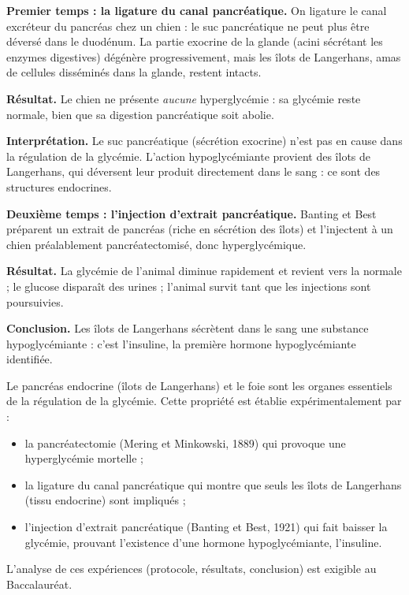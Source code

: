 \documentclass[11pt]{article}
\newcommand{\cle}[1]{{\popxbold\color{popdark}#1}}
\begin{document}
\begin{experience}
\textbf{Premier temps : la ligature du canal pancréatique.} On ligature le canal excréteur du pancréas chez un chien : le suc pancréatique ne peut plus être déversé dans le duodénum. La partie \cle{exocrine} de la glande (acini sécrétant les enzymes digestives) dégénère progressivement, mais les \cle{îlots de Langerhans}, amas de cellules disséminés dans la glande, restent intacts.

\textbf{Résultat.} Le chien ne présente \emph{aucune} hyperglycémie : sa glycémie reste normale, bien que sa digestion pancréatique soit abolie.

\textbf{Interprétation.} Le suc pancréatique (sécrétion exocrine) n'est pas en cause dans la régulation de la glycémie. L'action hypoglycémiante provient des îlots de Langerhans, qui déversent leur produit directement dans le sang : ce sont des structures \cle{endocrines}.

\textbf{Deuxième temps : l'injection d'extrait pancréatique.} Banting et Best préparent un extrait de pancréas (riche en sécrétion des îlots) et l'injectent à un chien préalablement pancréatectomisé, donc hyperglycémique.

\textbf{Résultat.} La glycémie de l'animal diminue rapidement et revient vers la normale ; le glucose disparaît des urines ; l'animal survit tant que les injections sont poursuivies.

\textbf{Conclusion.} Les îlots de Langerhans sécrètent dans le sang une substance hypoglycémiante : c'est l'\cle{insuline}, la première hormone hypoglycémiante identifiée.
\end{experience}

\begin{propriete}
Le \cle{pancréas endocrine} (îlots de Langerhans) et le \cle{foie} sont les organes essentiels de la régulation de la glycémie. Cette propriété est établie expérimentalement par :
\begin{itemize}
\item la pancréatectomie (Mering et Minkowski, 1889) qui provoque une hyperglycémie mortelle ;
\item la ligature du canal pancréatique qui montre que seuls les îlots de Langerhans (tissu endocrine) sont impliqués ;
\item l'injection d'extrait pancréatique (Banting et Best, 1921) qui fait baisser la glycémie, prouvant l'existence d'une hormone hypoglycémiante, l'insuline.
\end{itemize}
L'analyse de ces expériences (protocole, résultats, conclusion) est exigible au Baccalauréat.
\end{propriete}
\end{document}
